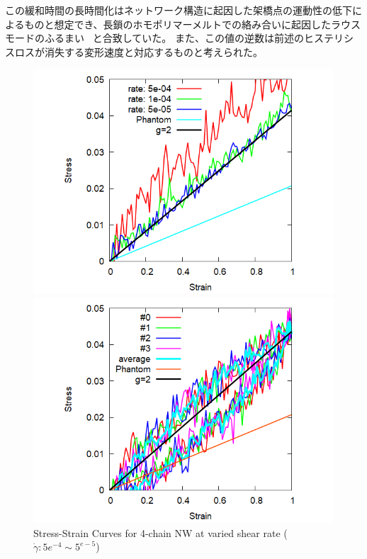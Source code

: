 \documentclass[uplatex,dvipdfmx,a4paper,11pt]{jsarticle}
\begin{document}
この緩和時間の長時間化はネットワーク構造に起因した架橋点の運動性の低下によるものと想定でき、長鎖のホモポリマーメルトでの絡み合いに起因したラウスモードのふるまい~\cite{rubinstein} と合致していた。
また、この値の逆数は前述のヒステリシスロスが消失する変形速度と対応するものと考えられた。
\vspace{-1mm}
\begin{figure}[hb]
\begin{minipage}{0.33\hsize}
    \begin{center}
        \includegraphics[width=.9\textwidth]{Shear_Random_4chain_N20_g2.png}
        \caption{Stress-Strain Curves for 4-chain NW at varied shear rate ($\dot{\gamma}: 5e^{-4} \sim 5^{e-5}$)}
        \label{fig:deform}
	\end{center}
\end{minipage}
\begin{minipage}{0.33\hsize}
	\begin{center}
        \includegraphics[width=.9\textwidth]{CyclicDeform_4chain_rate_2e-4_g2.png}

\end{center}
\end{minipage}
\end{figure}
\end{document}
